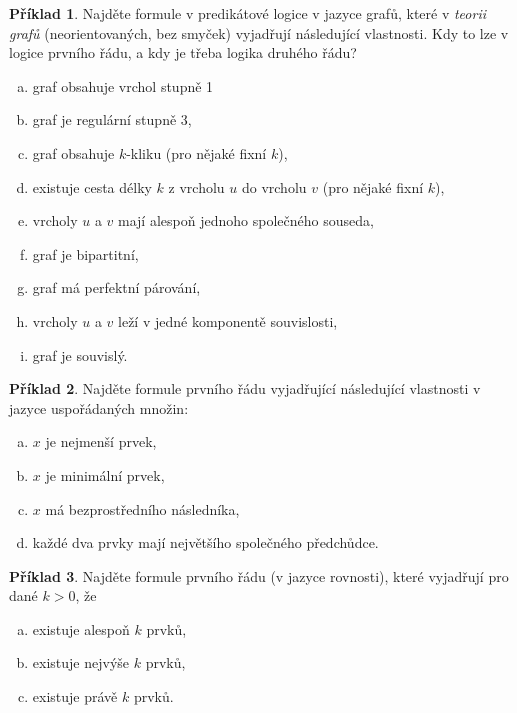 \documentclass[a4paper]{article}
\theoremstyle{definition}
\newtheorem{problem}{Příklad}
\begin{document}
\medskip\begin{problem}
Najděte formule v predikátové logice v jazyce grafů, které v \emph{teorii grafů} (neorientovaných, bez smyček) vyjadřují následující vlastnosti. Kdy to lze v logice prvního řádu, a kdy je třeba logika druhého řádu?
\begin{enumerate}[(a)]
    \item graf obsahuje vrchol stupně 1
    \item graf je regulární stupně 3,
    \item graf obsahuje $k$-kliku (pro nějaké fixní $k$),
    \item existuje cesta délky $k$ z vrcholu $u$ do vrcholu $v$ (pro nějaké fixní $k$),
    \item vrcholy $u$ a $v$ mají alespoň jednoho společného souseda,
    \item graf je bipartitní,
    \item graf má perfektní párování,
    \item vrcholy $u$ a $v$ leží v jedné komponentě souvislosti,
    \item graf je souvislý.    
\end{enumerate}
\end{problem}


\medskip\begin{problem} Najděte formule prvního řádu vyjadřující následující vlastnosti v jazyce uspořádaných množin:
\begin{enumerate}[(a)]
    \item $x$ je nejmenší prvek,
    \item $x$ je minimální prvek,
    \item $x$ má bezprostředního následníka,
    \item každé dva prvky mají největšího společného předchůdce.
\end{enumerate}
\end{problem}


\medskip\begin{problem} Najděte formule prvního řádu (v jazyce rovnosti), které vyjadřují pro dané $k>0$, že
\begin{enumerate}[(a)]
    \item existuje alespoň $k$ prvků,
    \item existuje nejvýše $k$ prvků,
    \item existuje právě $k$ prvků.
\end{enumerate}
\end{problem}
\end{document}
